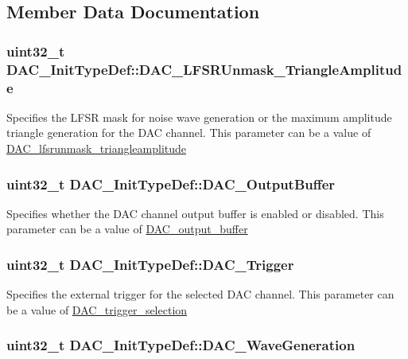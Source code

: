 \subsection{Member Data Documentation}
\hypertarget{structDAC__InitTypeDef_a27ed27a544d50781b20d59cc55e6cef8}{
\subsubsection[{DAC\_\-LFSRUnmask\_\-TriangleAmplitude}]{\setlength{\rightskip}{0pt plus 5cm}uint32\_\-t {\bf DAC\_\-InitTypeDef::DAC\_\-LFSRUnmask\_\-TriangleAmplitude}}}
\label{structDAC__InitTypeDef_a27ed27a544d50781b20d59cc55e6cef8}
Specifies the LFSR mask for noise wave generation or the maximum amplitude triangle generation for the DAC channel. This parameter can be a value of \hyperlink{group__DAC__lfsrunmask__triangleamplitude}{DAC\_\-lfsrunmask\_\-triangleamplitude} \hypertarget{structDAC__InitTypeDef_ad3e9e01486443e99f19e65a446b03ca6}{
\subsubsection[{DAC\_\-OutputBuffer}]{\setlength{\rightskip}{0pt plus 5cm}uint32\_\-t {\bf DAC\_\-InitTypeDef::DAC\_\-OutputBuffer}}}
\label{structDAC__InitTypeDef_ad3e9e01486443e99f19e65a446b03ca6}
Specifies whether the DAC channel output buffer is enabled or disabled. This parameter can be a value of \hyperlink{group__DAC__output__buffer}{DAC\_\-output\_\-buffer} \hypertarget{structDAC__InitTypeDef_a7b26ebaeb51a0157a781f7de8ba779e5}{
\subsubsection[{DAC\_\-Trigger}]{\setlength{\rightskip}{0pt plus 5cm}uint32\_\-t {\bf DAC\_\-InitTypeDef::DAC\_\-Trigger}}}
\label{structDAC__InitTypeDef_a7b26ebaeb51a0157a781f7de8ba779e5}
Specifies the external trigger for the selected DAC channel. This parameter can be a value of \hyperlink{group__DAC__trigger__selection}{DAC\_\-trigger\_\-selection} \hypertarget{structDAC__InitTypeDef_a6753e78ddd2dc8273444ba01a272d63a}{
\subsubsection[{DAC\_\-WaveGeneration}]{\setlength{\rightskip}{0pt plus 5cm}uint32\_\-t {\bf DAC\_\-InitTypeDef::DAC\_\-WaveGeneration}}}
